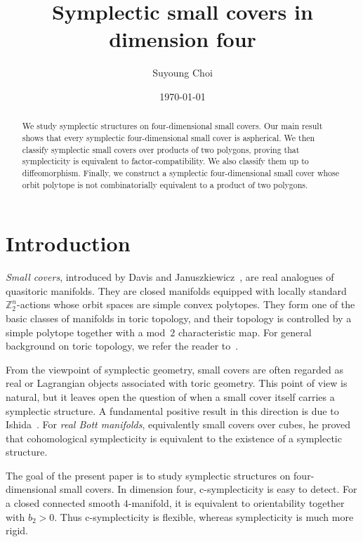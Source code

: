 \documentclass{amsart}
\title{Symplectic small covers in dimension four}
\author[S. Choi]{Suyoung Choi}
\date{\today}
\numberwithin{equation}{section}
\theoremstyle{definition}
\theoremstyle{remark}
\newcommand{\Z}{\mathbb Z}
\begin{document}
\begin{abstract}
    We study symplectic structures on four-dimensional small covers.
    Our main result shows that every symplectic four-dimensional small cover is aspherical.
    We then classify symplectic small covers over products of two polygons, proving that symplecticity is equivalent to factor-compatibility.
    We also classify them up to diffeomorphism.
    Finally, we construct a symplectic four-dimensional small cover whose orbit polytope is not combinatorially equivalent to a product of two polygons.
\end{abstract}

\maketitle


\section{Introduction}

\emph{Small covers}, introduced by Davis and Januszkiewicz~\cite{Davis-Januszkiewicz1991}, are real analogues of quasitoric manifolds.
They are closed manifolds equipped with locally standard $\Z_2^n$-actions whose orbit spaces are simple convex polytopes.
They form one of the basic classes of manifolds in toric topology, and their topology is controlled by a simple polytope together with a mod~$2$ characteristic map.
For general background on toric topology, we refer the reader to~\cite{Buchstaber-Panov2015book}.

From the viewpoint of symplectic geometry, small covers are often regarded as real or Lagrangian objects associated with toric geometry.
This point of view is natural, but it leaves open the question of when a small cover itself carries a symplectic structure.
A fundamental positive result in this direction is due to Ishida~\cite{Ishida2011}.
For \emph{real Bott manifolds}, equivalently small covers over cubes, he proved that cohomological symplecticity is equivalent to the existence of a symplectic structure.

The goal of the present paper is to study symplectic structures on four-dimensional small covers.
In dimension four, c-symplecticity is easy to detect.
For a closed connected smooth $4$-manifold, it is equivalent to orientability together with $b_2>0$.
Thus c-symplecticity is flexible, whereas symplecticity is much more rigid. 
\end{document}
